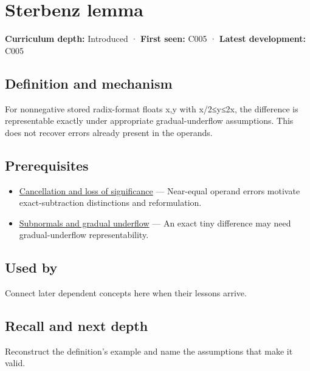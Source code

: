 \hypertarget{appendix-399b7ad53f39}{}\label{referencestart:appendix-399b7ad53f39}
\section{Sterbenz lemma}\label{appendix-399b7ad53f39-sterbenz-lemma}

\textbf{Curriculum depth:} Introduced · \textbf{First seen:} C005 · \textbf{Latest development:} C005

\subsection{Definition and mechanism}\label{appendix-399b7ad53f39-definition-and-mechanism}

For nonnegative stored radix-format floats x,y with x/2≤y≤2x, the difference is representable exactly under appropriate gradual-underflow assumptions. This does not recover errors already present in the operands.

\subsection{Prerequisites}\label{appendix-399b7ad53f39-prerequisites}

\begin{itemize}
\tightlist
\item
  \hyperref[appendix-a2773a6a2f9d]{Cancellation and loss of significance} --- Near-equal operand errors motivate exact-subtraction distinctions and reformulation.
\item
  \hyperref[appendix-00a6e044c437]{Subnormals and gradual underflow} --- An exact tiny difference may need gradual-underflow representability.
\end{itemize}

\subsection{Used by}\label{appendix-399b7ad53f39-used-by}

Connect later dependent concepts here when their lessons arrive.

\subsection{Recall and next depth}\label{appendix-399b7ad53f39-recall-and-next-depth}

Reconstruct the definition's example and name the assumptions that make it valid.

